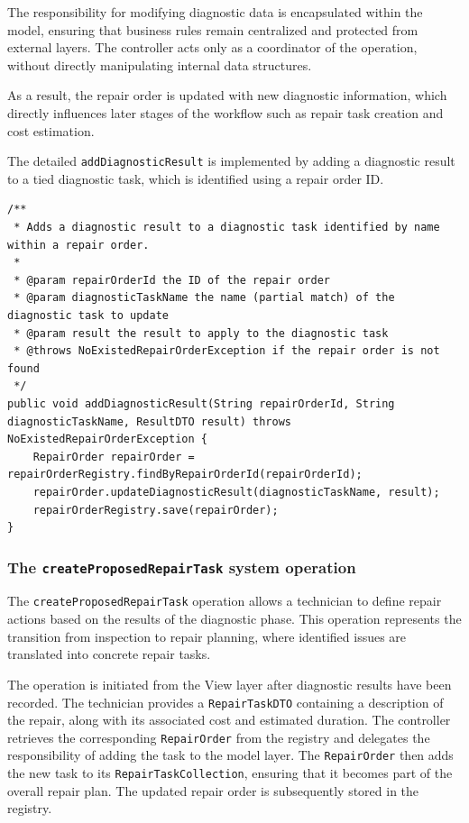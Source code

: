 \documentclass[a4paper]{scrartcl}
\begin{document}
The responsibility for modifying diagnostic data is encapsulated within the model, ensuring that business rules remain centralized and protected from external layers. The controller acts only as a coordinator of the operation, without directly manipulating internal data structures.

As a result, the repair order is updated with new diagnostic information, which directly influences later stages of the workflow such as repair task creation and cost estimation.

The detailed \texttt{addDiagnosticResult} is implemented by adding a diagnostic result to a tied diagnostic task, which is identified using a repair order ID.

\begin{lstlisting}[style=javastyle, caption={Add diagnostic result using \texttt{addDiagnosticResult} method in \texttt{TechnicianController}}]
/**
 * Adds a diagnostic result to a diagnostic task identified by name within a repair order.
 *
 * @param repairOrderId the ID of the repair order
 * @param diagnosticTaskName the name (partial match) of the diagnostic task to update
 * @param result the result to apply to the diagnostic task
 * @throws NoExistedRepairOrderException if the repair order is not found
 */
public void addDiagnosticResult(String repairOrderId, String diagnosticTaskName, ResultDTO result) throws NoExistedRepairOrderException {
    RepairOrder repairOrder = repairOrderRegistry.findByRepairOrderId(repairOrderId);
    repairOrder.updateDiagnosticResult(diagnosticTaskName, result);
    repairOrderRegistry.save(repairOrder);
}
\end{lstlisting}

\subsubsection{The \texttt{createProposedRepairTask} system operation}

The \texttt{createProposedRepairTask} operation allows a technician to define repair actions based on the results of the diagnostic phase. This operation represents the transition from inspection to repair planning, where identified issues are translated into concrete repair tasks.

The operation is initiated from the View layer after diagnostic results have been recorded. The technician provides a \texttt{RepairTaskDTO} containing a description of the repair, along with its associated cost and estimated duration. The controller retrieves the corresponding \texttt{RepairOrder} from the registry and delegates the responsibility of adding the task to the model layer. The \texttt{RepairOrder} then adds the new task to its \texttt{RepairTaskCollection}, ensuring that it becomes part of the overall repair plan. The updated repair order is subsequently stored in the registry.
\end{document}
